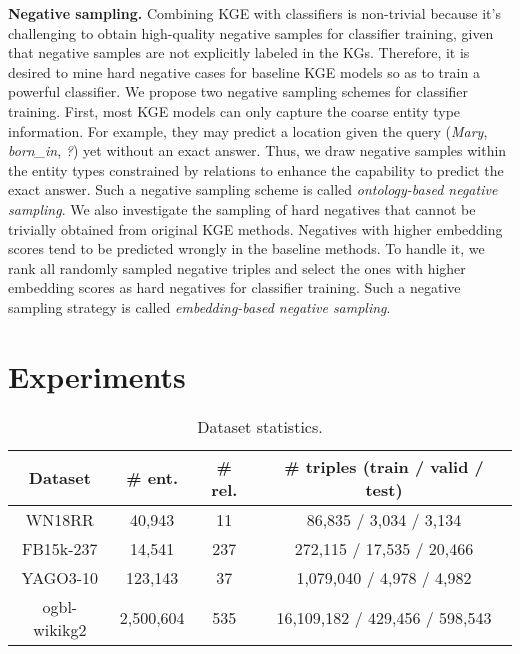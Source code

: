 \documentclass{article}
\begin{document}
\textbf{Negative sampling.} Combining KGE with classifiers is non-trivial 
because it's challenging to obtain high-quality negative samples for classifier
training, given that negative samples are not explicitly labeled in the KGs. 
Therefore, it is desired to mine hard negative cases for baseline KGE models
so as to train a powerful classifier. 
We propose two negative sampling schemes for classifier training.
First, most KGE models can only capture the
coarse entity type information. For example, they may predict a location
given the query (\emph{Mary}, \emph{born\_in}, \emph{?}) yet
without an exact answer. Thus, we draw negative samples within the
entity types constrained by relations \citep{krompass2015type}
to enhance the capability to predict the exact answer.  
Such a negative sampling scheme is called
\emph{ontology-based negative sampling}.  We also investigate the sampling of
hard negatives that cannot be trivially obtained from original KGE
methods. Negatives with higher embedding scores  tend to be predicted wrongly in the baseline methods. To handle
it, we rank all randomly sampled negative triples and select the ones
with higher embedding scores as hard negatives for classifier training.
Such a negative sampling strategy is called \emph{embedding-based negative sampling}. 


\section{Experiments}\label{sec:experiment}

\begin{table}[!t]
\color{black}
\setlength\tabcolsep{3pt}
\centering
\begin{tabular}{ c c c c }
\toprule
Dataset & \# ent. & \# rel. & \# triples (train / valid / test) 
\\
\midrule
WN18RR    &40,943 &11 &86,835 / 3,034 / 3,134 
\\
FB15k-237 &14,541 &237 &272,115 / 17,535 / 20,466 
\\
YAGO3-10 &123,143 &37 &1,079,040 / 4,978 / 4,982
\\ \midrule
ogbl-wikikg2 & 2,500,604 & 535 & 16,109,182 / 429,456 / 598,543
\\
\bottomrule
\end{tabular}
\caption{Dataset statistics.}
\label{table:dataset}
\end{table}
\end{document}
